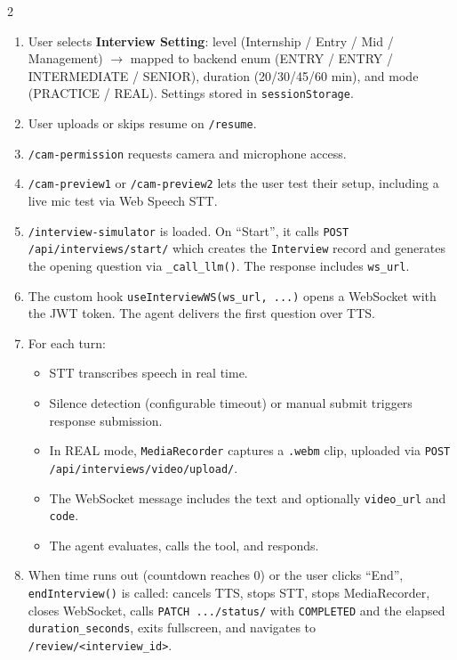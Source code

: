 \documentclass[10pt, a4paper]{article}
\begin{document}
\begin{multicols}{2}
\begin{enumerate}
  \item User selects \textbf{Interview Setting}: level (Internship / Entry
        / Mid / Management) $\to$ mapped to backend enum (ENTRY / ENTRY /
        INTERMEDIATE / SENIOR), duration (20/30/45/60 min), and mode
        (PRACTICE / REAL). Settings stored in \texttt{sessionStorage}.
  \item User uploads or skips resume on \texttt{/resume}.
  \item \texttt{/cam-permission} requests camera and microphone access.
  \item \texttt{/cam-preview1} or \texttt{/cam-preview2} lets the user
        test their setup, including a live mic test via Web Speech STT.
  \item \texttt{/interview-simulator} is loaded. On ``Start'', it calls
        \texttt{POST /api/interviews/start/} which creates the
        \texttt{Interview} record and generates the opening question via
        \texttt{\_call\_llm()}. The response includes \texttt{ws\_url}.
  \item The custom hook \texttt{useInterviewWS(ws\_url, ...)} opens a
        WebSocket with the JWT token. The agent delivers the first question
        over TTS.
  \item For each turn:
    \begin{itemize}
      \item STT transcribes speech in real time.
      \item Silence detection (configurable timeout) or manual submit
            triggers response submission.
      \item In REAL mode, \texttt{MediaRecorder} captures a \texttt{.webm}
            clip, uploaded via \texttt{POST /api/interviews/video/upload/}.
      \item The WebSocket message includes the text and optionally
            \texttt{video\_url} and \texttt{code}.
      \item The agent evaluates, calls the tool, and responds.
    \end{itemize}
  \item When time runs out (countdown reaches 0) or the user clicks
        ``End'', \texttt{endInterview()} is called:
        cancels TTS, stops STT, stops MediaRecorder, closes WebSocket,
        calls \texttt{PATCH .../status/} with \texttt{COMPLETED} and the
        elapsed \texttt{duration\_seconds}, exits fullscreen, and navigates
        to \texttt{/review/<interview\_id>}.
\end{enumerate}


\end{multicols}
\end{document}
